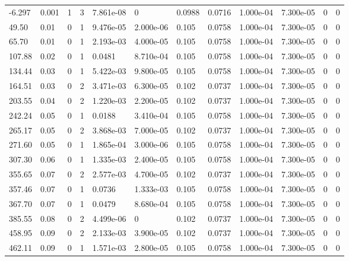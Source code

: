 \documentclass[preview]{standalone}
\begin{document}
{{\begin{tabular}{L{1.2cm}C{1.2cm} C{0.3cm}C{0.5cm} C{1.4cm}C{1.4cm} C{1.4cm}C{1.4cm} C{1.6cm}C{1.6cm} C{1.6cm}C{1.6cm}}
  -6.297  &  0.001  & 1     &  3 &  7.861e-08  & 0  &  0.0988&   0.0716& 1.000e-04 & 7.300e-05   &  0 & 0  \\ 
  49.50  &  0.01  & 0     &  1 &  9.476e-05  & 2.000e-06  &  0.105&   0.0758& 1.000e-04 & 7.300e-05   &  0 & 0  \\ 
  65.70  &  0.01  & 0     &  1 &  2.193e-03  & 4.000e-05  &  0.105&   0.0758& 1.000e-04 & 7.300e-05   &  0 & 0  \\ 
  107.88  &  0.02  & 0     &  1 &  0.0481  & 8.710e-04  &  0.105&   0.0758& 1.000e-04 & 7.300e-05   &  0 & 0  \\ 
  134.44  &  0.03  & 0     &  1 &  5.422e-03  & 9.800e-05  &  0.105&   0.0758& 1.000e-04 & 7.300e-05   &  0 & 0  \\ 
  164.51  &  0.03  & 0     &  2 &  3.471e-03  & 6.300e-05  &  0.102&   0.0737& 1.000e-04 & 7.300e-05   &  0 & 0  \\ 
  203.55  &  0.04  & 0     &  2 &  1.220e-03  & 2.200e-05  &  0.102&   0.0737& 1.000e-04 & 7.300e-05   &  0 & 0  \\ 
  242.24  &  0.05  & 0     &  1 &  0.0188  & 3.410e-04  &  0.105&   0.0758& 1.000e-04 & 7.300e-05   &  0 & 0  \\ 
  265.17  &  0.05  & 0     &  2 &  3.868e-03  & 7.000e-05  &  0.102&   0.0737& 1.000e-04 & 7.300e-05   &  0 & 0  \\ 
  271.60  &  0.05  & 0     &  1 &  1.865e-04  & 3.000e-06  &  0.105&   0.0758& 1.000e-04 & 7.300e-05   &  0 & 0  \\ 
  307.30  &  0.06  & 0     &  1 &  1.335e-03  & 2.400e-05  &  0.105&   0.0758& 1.000e-04 & 7.300e-05   &  0 & 0  \\ 
  355.65  &  0.07  & 0     &  2 &  2.577e-03  & 4.700e-05  &  0.102&   0.0737& 1.000e-04 & 7.300e-05   &  0 & 0  \\ 
  357.46  &  0.07  & 0     &  1 &  0.0736  & 1.333e-03  &  0.105&   0.0758& 1.000e-04 & 7.300e-05   &  0 & 0  \\ 
  367.70  &  0.07  & 0     &  1 &  0.0479  & 8.680e-04  &  0.105&   0.0758& 1.000e-04 & 7.300e-05   &  0 & 0  \\ 
  385.55  &  0.08  & 0     &  2 &  4.499e-06  & 0  &  0.102&   0.0737& 1.000e-04 & 7.300e-05   &  0 & 0  \\ 
  458.95  &  0.09  & 0     &  2 &  2.133e-03  & 3.900e-05  &  0.102&   0.0737& 1.000e-04 & 7.300e-05   &  0 & 0  \\ 
  462.11  &  0.09  & 0     &  1 &  1.571e-03  & 2.800e-05  &  0.105&   0.0758& 1.000e-04 & 7.300e-05   &  0 & 0  \\ 

\end{tabular}}}
\end{document}
